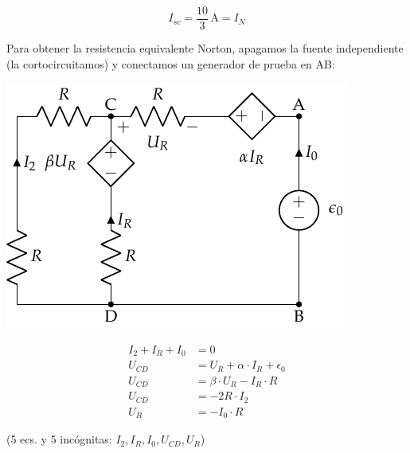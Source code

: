 \vspace{-1mm}
\begin{equation*}
I_{sc} = \boxed{\frac{10}{3}\,\si{\ampere} = I_N}
\end{equation*}
  
\vspace{3mm}
Para obtener la resistencia equivalente Norton, apagamos la fuente independiente (la cortocircuitamos) y conectamos un generador de prueba en AB:

\vspace{2mm}
\begin{minipage}{0.5\linewidth}
  \hspace{6mm}
  \includegraphics[width=.9\linewidth]{figuras/norton_fuenteprueba.pdf}
\end{minipage}
\begin{minipage}{0.5\linewidth}

  \vspace{-3mm}
  \begin{align}
    I_2 + I_R + I_0 &= 0 \label{eq:2.1}\\
    U_{CD} &= U_R + \alpha \cdot I_R + \epsilon_0 \label{eq:2.2}\\
    U_{CD} &= \beta \cdot U_R - I_R \cdot R \label{eq:2.3}\\
    U_{CD} &= -2R\cdot I_2 \label{eq:2.4}\\
    U_R &= -I_0 \cdot R \label{eq:2.5}
  \end{align}

  \vspace{-1mm}
    \begin{center}
      (5 ecs. y 5 incógnitas: $I_2, I_R, I_0, U_{CD}, U_R$)
    \end{center}
\end{minipage}

